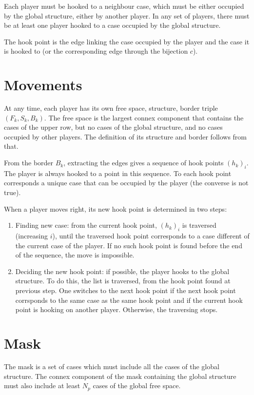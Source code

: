 Each player must be hooked to a neighbour case, which must be either occupied by
the global structure, either by another player. In any set of players, there must
be at least one player hooked to a case occupied by the global structure.

The hook point is the edge linking the case occupied by the player and the case
it is hooked to (or the corresponding edge through the bijection $c$).

\section{Movements}

At any time, each player has its own free space, structure, border triple $(F_k, S_k, B_k)$.
The free space is the largest connex component that contains the cases of the upper row,
but no cases of the global structure, and no cases occupied by other players.
The definition of its structure and border follows from that.

From the border $B_k$, extracting the edges gives a sequence of hook points $(h_k)_i$.
The player is always hooked to a point in this sequence.
To each hook point corresponds a unique case that can be occupied by the player
(the converse is not true).

When a player moves right, its new hook point is determined in two steps:
\begin{enumerate}
    \item Finding new case: from the current hook point, $(h_k)_i$ is traversed
        (increasing $i$), until the traversed hook point corresponds to a case
        different of the current case of the player. If no such hook point is
        found before the end of the sequence, the move is impossible.
    \item Deciding the new hook point: if possible, the player hooks to the
        global structure. To do this, the list is traversed, from the hook
        point found at previous step. One switches to the next hook point if
        the next hook point corrsponds to the same case as the same hook point
        and if the current hook point is hooking on another player. Otherwise,
        the traversing stops.
\end{enumerate}

\section{Mask}

The mask is a set of cases which must include all the cases of the global
structure. The connex component of the mask containing the global structure
must also include at least $N_p$ cases of the global free space.

